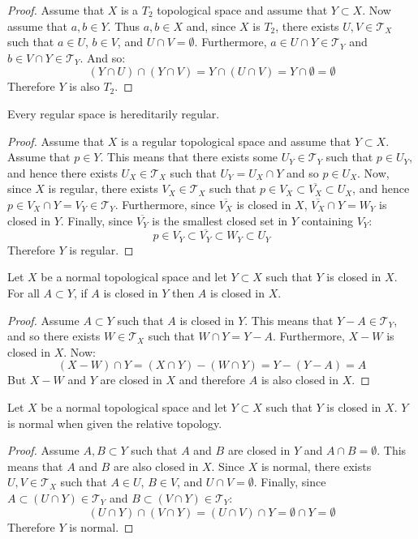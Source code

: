 \documentclass[letterpaper,12pt,fleqn]{article}
\newcommand{\T}{\mathscr{T}}
\begin{document}
\begin{proof}
  Assume that \(X\) is a \(T_2\) topological space and assume that \(Y\subset X\).  Now assume that \(a,b\in Y\).
  Thus \(a,b\in X\) and, since \(X\) is \(T_2\), there exists \(U,V\in\T_X\) such that \(a\in U\), \(b\in V\), and
  \(U\cap V=\emptyset\).  Furthermore, \(a\in U\cap Y\in\T_Y\) and \(b\in V\cap Y\in\T_Y\).  And so:
  \[(Y\cap U)\cap(Y\cap V)=Y\cap(U\cap V)=Y\cap\emptyset=\emptyset\]
  Therefore \(Y\) is also \(T_2\).
\end{proof}

\begin{theorem}[4.20]
  Every regular space is hereditarily regular.
\end{theorem}

\begin{proof}
  Assume that \(X\) is a regular topological space and assume that \(Y\subset X\).  Assume that \(p\in Y\).  This
  means that there exists some \(U_Y\in\T_Y\) such that \(p\in U_Y\), and hence there exists \(U_X\in\T_X\) such
  that \(U_Y=U_X\cap Y\) and so \(p\in U_X\).  Now, since \(X\) is regular, there exists \(V_X\in\T_X\) such that
  \(p\in V_X\subset\overline{V_X}\subset U_X\), and hence \(p\in V_X\cap Y=V_Y\in\T_Y\).  Furthermore, since
  \(\overline{V_X}\) is closed in \(X\), \(\overline{V_X}\cap Y=W_Y\) is closed in \(Y\).  Finally, since
  \(\overline{V_Y}\) is the smallest closed set in \(Y\) containing \(V_Y\):
  \[p\in V_Y\subset\overline{V_Y}\subset W_Y\subset U_Y\]
  Therefore \(Y\) is regular.
\end{proof}

\begin{lemma}
  Let \(X\) be a normal topological space and let \(Y\subset X\) such that \(Y\) is closed in \(X\).  For all
  \(A\subset Y\), if \(A\) is closed in \(Y\) then \(A\) is closed in \(X\).
\end{lemma}

\begin{proof}
  Assume \(A\subset Y\) such that \(A\) is closed in \(Y\).  This means that \(Y-A\in\T_Y\), and so there exists
  \(W\in\T_X\) such that \(W\cap Y=Y-A\).  Furthermore, \(X-W\) is closed in \(X\).  Now:
  \[(X-W)\cap Y=(X\cap Y)-(W\cap Y)=Y-(Y-A)=A\]
  But \(X-W\) and \(Y\) are closed in \(X\) and therefore \(A\) is also closed in \(X\).
\end{proof}

\begin{theorem}[4.23]
  Let \(X\) be a normal topological space and let \(Y\subset X\) such that \(Y\) is closed in \(X\).  \(Y\) is
  normal when given the relative topology.
\end{theorem}

\begin{proof}
  Assume \(A,B\subset Y\) such that \(A\) and \(B\) are closed in \(Y\) and \(A\cap B=\emptyset\).  This means that
  \(A\) and \(B\) are also closed in \(X\).  Since \(X\) is normal, there exists \(U,V\in\T_X\) such that \(A\in U\),
  \(B\in V\), and \(U\cap V=\emptyset\).  Finally, since \(A\subset(U\cap Y)\in\T_Y\) and \(B\subset(V\cap Y)\in\T_Y\):
  \[(U\cap Y)\cap(V\cap Y)=(U\cap V)\cap Y=\emptyset\cap Y=\emptyset\]
  Therefore \(Y\) is normal.
\end{proof}
\end{document}
